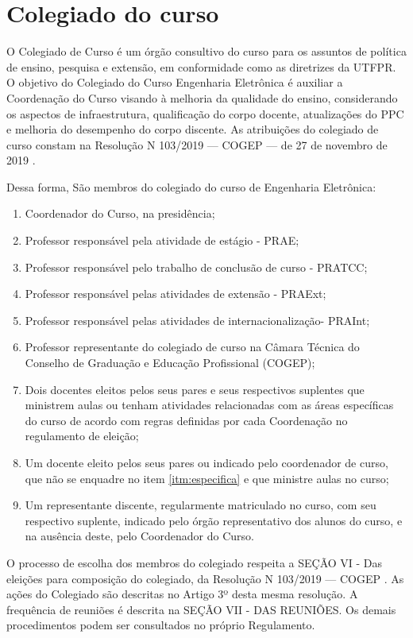 \section{Colegiado do curso}

O Colegiado de Curso é um órgão consultivo do curso para os assuntos de política de ensino, pesquisa e extensão, em conformidade como as diretrizes da UTFPR. O objetivo do Colegiado do Curso Engenharia Eletrônica é auxiliar a Coordenação do Curso visando à melhoria da qualidade do ensino, considerando os aspectos de infraestrutura, qualificação do corpo docente, atualizações do PPC e melhoria do desempenho do corpo discente. As atribuições do colegiado de curso constam na Resolução N\textordmasculine{} 103/2019 — COGEP — de 27 de novembro de 2019 \cite{cogep103}.

Dessa forma, São membros do colegiado do curso de Engenharia Eletrônica:

\begin{enumerate}
    \item Coordenador do Curso, na presidência;
    \item Professor responsável pela atividade de estágio - PRAE;
    \item Professor responsável pelo trabalho de conclusão de curso - PRATCC;
    \item Professor responsável pelas atividades de extensão - PRAExt;
    \item Professor responsável pelas atividades de internacionalização- PRAInt;
    \item Professor representante do colegiado de curso na Câmara Técnica do Conselho de Graduação e Educação Profissional (COGEP);
    \item \label{itm:especifica}Dois docentes eleitos pelos seus pares e seus respectivos suplentes que ministrem aulas ou tenham atividades relacionadas com as áreas específicas do curso de acordo com regras definidas por cada Coordenação no regulamento de eleição;
    \item Um docente eleito pelos seus pares ou indicado pelo coordenador de curso, que não se enquadre no item \ref{itm:especifica} e que ministre aulas no curso;
    \item Um representante discente, regularmente matriculado no curso, com seu respectivo suplente, indicado pelo órgão representativo dos alunos do curso, e na ausência deste, pelo Coordenador do Curso.
\end{enumerate}

O processo de escolha dos membros do colegiado respeita a SEÇÃO VI - Das eleições para composição do colegiado, da Resolução N\textordmasculine{} 103/2019 — COGEP \cite{cogep103}. As ações do Colegiado são descritas no Artigo 3º desta mesma resolução. A frequência de reuniões é descrita na SEÇÃO VII - DAS REUNIÕES. Os demais procedimentos podem ser consultados no próprio Regulamento.

